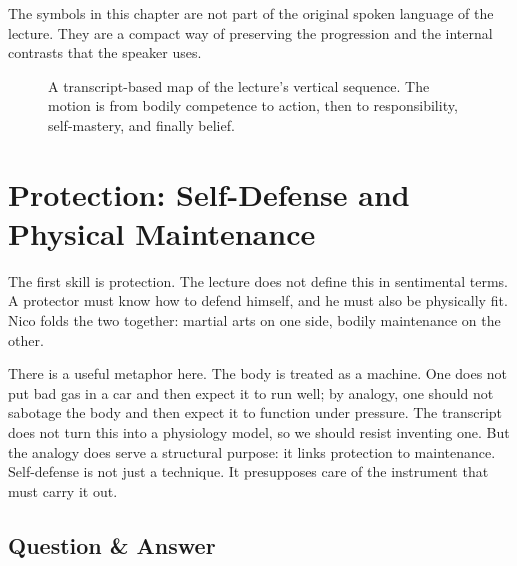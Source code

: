 \begin{remark}
The symbols in this chapter are not part of the original spoken language of the lecture. They are a compact way of preserving the progression and the internal contrasts that the speaker uses.
\end{remark}

\begin{figure}[h]
\centering
{}
\caption{A transcript-based map of the lecture's vertical sequence. The motion is from bodily competence to action, then to responsibility, self-mastery, and finally belief.}
\end{figure}

\section{Protection: Self-Defense and Physical Maintenance}

The first skill is protection. The lecture does not define this in sentimental terms. A protector must know how to defend himself, and he must also be physically fit. Nico folds the two together: martial arts on one side, bodily maintenance on the other.

There is a useful metaphor here. The body is treated as a machine. One does not put bad gas in a car and then expect it to run well; by analogy, one should not sabotage the body and then expect it to function under pressure. The transcript does not turn this into a physiology model, so we should resist inventing one. But the analogy does serve a structural purpose: it links protection to maintenance. Self-defense is not just a technique. It presupposes care of the instrument that must carry it out.

\subsection{Question \& Answer}

